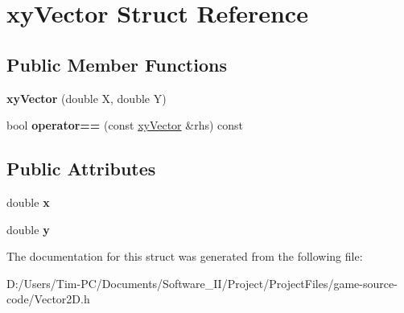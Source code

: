 \hypertarget{structxy_vector}{}\section{xy\+Vector Struct Reference}
\label{structxy_vector}
\subsection*{Public Member Functions}
\begin{DoxyCompactItemize}
\item 
\mbox{\label{structxy_vector_a06d9403f8df005a7ea3b7765973a93fe}} 
{\bfseries xy\+Vector} (double X, double Y)
\item 
\mbox{\label{structxy_vector_a7aca10ebc499fdf7944792741edec285}} 
bool {\bfseries operator==} (const \hyperlink{structxy_vector}{xy\+Vector} \&rhs) const
\end{DoxyCompactItemize}
\subsection*{Public Attributes}
\begin{DoxyCompactItemize}
\item 
\mbox{\label{structxy_vector_a104b718a786e5743e9ab2c76a7b30bbf}} 
double {\bfseries x}
\item 
\mbox{\label{structxy_vector_a9ca5953fcf4a614693e0e56ef5f52ee4}} 
double {\bfseries y}
\end{DoxyCompactItemize}


The documentation for this struct was generated from the following file\+:\begin{DoxyCompactItemize}
\item 
D\+:/\+Users/\+Tim-\/\+P\+C/\+Documents/\+Software\+\_\+\+I\+I/\+Project/\+Project\+Files/game-\/source-\/code/Vector2\+D.\+h\end{DoxyCompactItemize}
